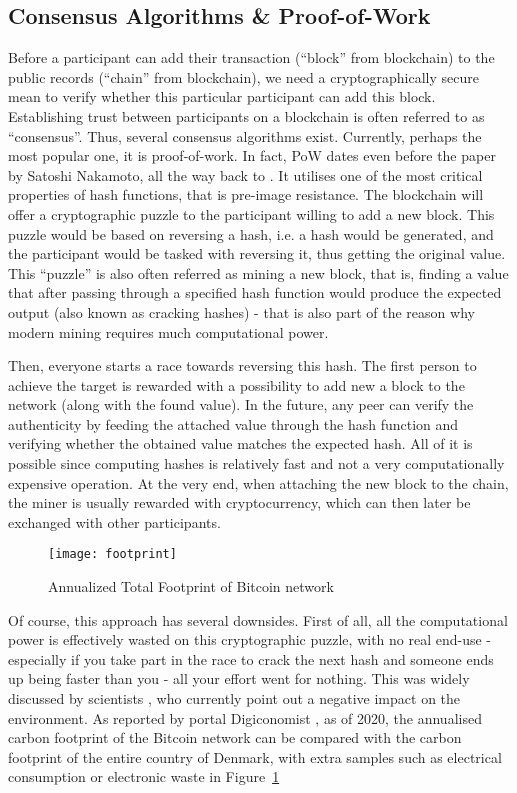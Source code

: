 \subsection{Consensus Algorithms \& Proof-of-Work}\label{sec:pow}
Before a participant can add their transaction (``block'' from blockchain) to the public records (``chain'' from blockchain), we need a cryptographically secure mean to verify whether this particular participant can add this block. Establishing trust between participants on a blockchain is often referred to as ``consensus''. Thus, several consensus algorithms exist. Currently, perhaps the most popular one, it is proof-of-work. In fact, PoW dates even before the paper by Satoshi Nakamoto, all the way back to \citet{jakobsson1999proofs}. It utilises one of the most critical properties of hash functions, that is pre-image resistance. The blockchain will offer a cryptographic puzzle to the participant willing to add a new block. This puzzle would be based on reversing a hash, i.e. a hash would be generated, and the participant would be tasked with reversing it, thus getting the original value. This ``puzzle'' is also often referred as mining a new block, that is, finding a value that after passing through a specified hash function would produce the expected output (also known as cracking hashes) - that is also part of the reason why modern mining requires much computational power. 

Then, everyone starts a race towards reversing this hash. The first person to achieve the target is rewarded with a possibility to add new a block to the network (along with the found value). In the future, any peer can verify the authenticity by feeding the attached value through the hash function and verifying whether the obtained value matches the expected hash. All of it is possible since computing hashes is relatively fast and not a very computationally expensive operation. At the very end, when attaching the new block to the chain, the miner is usually rewarded with cryptocurrency, which can then later be exchanged with other participants.

\begin{figure}[ht]
    \centering
    \texttt{[image: footprint]}
    \caption{Annualized Total Footprint of Bitcoin network \cite{index2017digiconomist}}
    \label{fig:footprint}
\end{figure}

Of course, this approach has several downsides. First of all, all the computational power is effectively wasted on this cryptographic puzzle, with no real end-use - especially if you take part in the race to crack the next hash and someone ends up being faster than you - all your effort went for nothing. This was widely discussed by scientists \cite{gervais2016security}, who currently point out a negative impact on the environment. As reported by portal Digiconomist \cite{index2017digiconomist}, as of 2020, the annualised carbon footprint of the Bitcoin network can be compared with the carbon footprint of the entire country of Denmark, with extra samples such as electrical consumption or electronic waste in Figure~\ref{fig:footprint}

